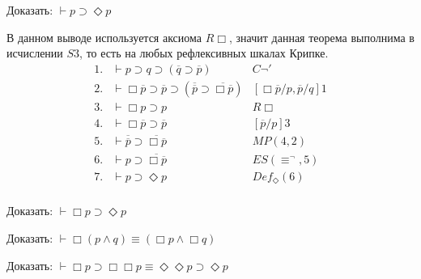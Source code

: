 \begin{task}
    Доказать: $\vdash p \supset \Diamond p$
\end{task}
\begin{solution}
    В данном выводе используется аксиома $R\Box$, значит данная теорема выполнима в исчислении $S3$, то есть на любых рефлексивных шкалах Крипке.
    \begin{equation*}
        \begin{array}{llr}
            1.  & \vdash p \supset q \supset (\overline{q} \supset \overline{p})
                & C\lnot'
                \\
            2.  & \vdash \Box \overline{p} \supset \overline{p} \supset (\overline{\overline{p}} \supset \overline{\Box \overline{p}})
                & [\Box\overline{p}/p, \overline{p}/q]1
                \\
            3.  & \vdash \Box p \supset p
                & R\Box
                \\
            4.  & \vdash \Box \overline{p} \supset \overline{p}
                & [\overline{p}/p]3
                \\
            5.  & \vdash \overline{\overline{p}} \supset \overline{\Box\overline{p}}
                & MP(4,2)
                \\
            6.  & \vdash p \supset \overline{\Box\overline{p}}
                & ES(\equiv^{\lnot}, 5)
                \\
            7.  & \vdash p \supset \Diamond p
                & Def_{\Diamond}(6)
                \\
        \end{array}
    \end{equation*}
\end{solution}

\begin{task}
    Доказать: $\vdash \Box p \supset \Diamond p$
\end{task}

\begin{task}
    Доказать: $\vdash \Box(p \land q) \equiv (\Box p \land \Box q)$
\end{task}

\begin{task}
    Доказать: $\vdash \Box p \supset \Box \Box p \equiv \Diamond \Diamond p \supset \Diamond p $
\end{task}